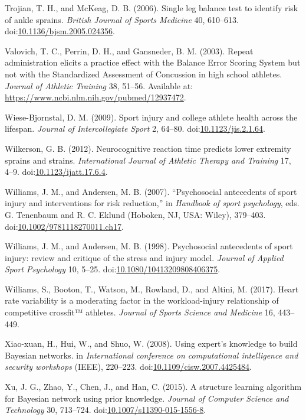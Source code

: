 \documentclass[
  english,
  man,floatsintext]{apa6}
\newlength{\cslhangindent}
\newenvironment{cslreferences}%
  {\setlength{\parindent}{0pt}%
  \everypar{\setlength{\hangindent}{\cslhangindent}}\ignorespaces}%
  {\par}
\begin{document}
\begin{cslreferences}
\leavevmode\hypertarget{ref-Trojian2006}{}%
Trojian, T. H., and McKeag, D. B. (2006). Single leg balance test to identify risk of ankle sprains. \emph{British Journal of Sports Medicine} 40, 610--613. doi:\href{https://doi.org/10.1136/bjsm.2005.024356}{10.1136/bjsm.2005.024356}.

\leavevmode\hypertarget{ref-Valovich2003}{}%
Valovich, T. C., Perrin, D. H., and Gansneder, B. M. (2003). Repeat administration elicits a practice effect with the Balance Error Scoring System but not with the Standardized Assessment of Concussion in high school athletes. \emph{Journal of Athletic Training} 38, 51--56. Available at: \url{https://www.ncbi.nlm.nih.gov/pubmed/12937472}.

\leavevmode\hypertarget{ref-Wiese-Bjornstal2009}{}%
Wiese-Bjornstal, D. M. (2009). Sport injury and college athlete health across the lifespan. \emph{Journal of Intercollegiate Sport} 2, 64--80. doi:\href{https://doi.org/10.1123/jis.2.1.64}{10.1123/jis.2.1.64}.

\leavevmode\hypertarget{ref-Wilkerson2012a}{}%
Wilkerson, G. B. (2012). Neurocognitive reaction time predicts lower extremity sprains and strains. \emph{International Journal of Athletic Therapy and Training} 17, 4--9. doi:\href{https://doi.org/10.1123/ijatt.17.6.4}{10.1123/ijatt.17.6.4}.

\leavevmode\hypertarget{ref-Williams2007}{}%
Williams, J. M., and Andersen, M. B. (2007). ``Psychosocial antecedents of sport injury and interventions for risk reduction,'' in \emph{Handbook of sport psychology}, eds. G. Tenenbaum and R. C. Eklund (Hoboken, NJ, USA: Wiley), 379--403. doi:\href{https://doi.org/10.1002/9781118270011.ch17}{10.1002/9781118270011.ch17}.

\leavevmode\hypertarget{ref-Williams1998}{}%
Williams, J. M., and Andersen, M. B. (1998). Psychosocial antecedents of sport injury: review and critique of the stress and injury model. \emph{Journal of Applied Sport Psychology} 10, 5--25. doi:\href{https://doi.org/10.1080/10413209808406375}{10.1080/10413209808406375}.

\leavevmode\hypertarget{ref-Williams2017}{}%
Williams, S., Booton, T., Watson, M., Rowland, D., and Altini, M. (2017). Heart rate variability is a moderating factor in the workload-injury relationship of competitive crossfit™ athletes. \emph{Journal of Sports Science and Medicine} 16, 443--449.

\leavevmode\hypertarget{ref-Xiao-xuan2007}{}%
Xiao-xuan, H., Hui, W., and Shuo, W. (2008). Using expert's knowledge to build Bayesian networks. in \emph{International conference on computational intelligence and security workshops} (IEEE), 220--223. doi:\href{https://doi.org/10.1109/cisw.2007.4425484}{10.1109/cisw.2007.4425484}.

\leavevmode\hypertarget{ref-Xu2015}{}%
Xu, J. G., Zhao, Y., Chen, J., and Han, C. (2015). A structure learning algorithm for Bayesian network using prior knowledge. \emph{Journal of Computer Science and Technology} 30, 713--724. doi:\href{https://doi.org/10.1007/s11390-015-1556-8}{10.1007/s11390-015-1556-8}.
\end{cslreferences}

\endgroup
\end{document}
